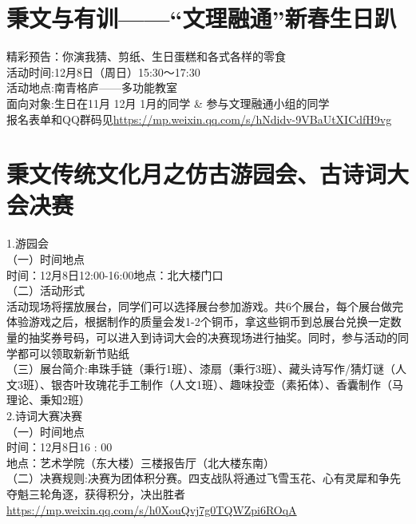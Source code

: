 \documentclass[letterpaper, 12pt]{article}
\begin{document}
\begin{multicols}{2}
\section{秉文与有训——“文理融通”新春生日趴}
精彩预告：你演我猜、剪纸、生日蛋糕和各式各样的零食\\
活动时间:12月8日（周日）15:30～17:30\\
活动地点:南青格庐——多功能教室\\
面向对象:生日在11月 12月 1月的同学 \& 参与文理融通小组的同学~\\
报名表单和QQ群码见\url{https://mp.weixin.qq.com/s/hNdidv-9VBaUtXICdfH9vg}

\section{秉文传统文化月之仿古游园会、古诗词大会决赛}
1.游园会\\
（一）时间地点\\
时间：12月8日12:00-16:00地点：北大楼门口\\
（二）活动形式\\
活动现场将摆放展台，同学们可以选择展台参加游戏。共6个展台，每个展台做完体验游戏之后，根据制作的质量会发1-2个铜币，拿这些铜币到总展台兑换一定数量的抽奖券号码，可以进入到诗词大会的决赛现场进行抽奖。同时，参与活动的同学都可以领取新新节贴纸\\
（三）展台简介:串珠手链（秉行1班）、漆扇（秉行3班）、藏头诗写作/猜灯谜（人文3班）、银杏叶玫瑰花手工制作（人文1班）、趣味投壶（素拓体）、香囊制作（马理论、秉知2班）\\
2.诗词大赛决赛\\
（一）时间地点\\
时间：12月8日16 : 00\\
地点：艺术学院（东大楼）三楼报告厅（北大楼东南）\\
（二）决赛规则:决赛为团体积分赛。四支战队将通过飞雪玉花、心有灵犀和争先夺魁三轮角逐，获得积分，决出胜者\\
\url{https://mp.weixin.qq.com/s/h0XouQvj7g0TQWZpi6ROqA}


\end{multicols}
\end{document}
